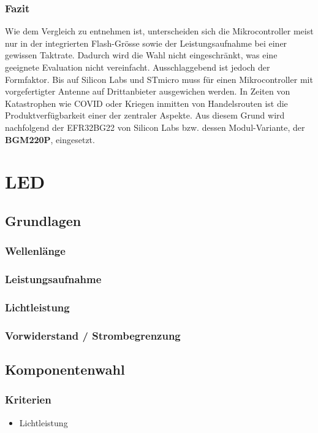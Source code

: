 \documentclass[12pt]{article}
\begin{document}
	\subsubsection{Fazit}
	Wie dem Vergleich zu entnehmen ist, unterscheiden sich die Mikrocontroller meist nur in der integrierten Flash-Grösse sowie der Leistungsaufnahme bei einer gewissen Taktrate. Dadurch wird die Wahl nicht eingeschränkt, was eine geeignete Evaluation nicht vereinfacht. Ausschlaggebend ist jedoch der Formfaktor. Bis auf Silicon Labs und STmicro muss für einen Mikrocontroller mit vorgefertigter Antenne auf Drittanbieter ausgewichen werden. In Zeiten von Katastrophen wie COVID oder Kriegen inmitten von Handelsrouten ist die Produktverfügbarkeit einer der zentraler Aspekte. Aus diesem Grund wird nachfolgend der EFR32BG22 von Silicon Labs bzw. dessen Modul-Variante, der \textbf{BGM220P}, eingesetzt.
	
	\newpage
	\section{LED}
	\subsection{Grundlagen}
	\subsubsection{Wellenlänge}
	\subsubsection{Leistungsaufnahme}
	\subsubsection{Lichtleistung}
	\subsubsection{Vorwiderstand / Strombegrenzung}
	\subsection{Komponentenwahl}
	\subsubsection{Kriterien}
	\begin{itemize}
		\item Lichtleistung 
	\end{itemize}
\end{document}
